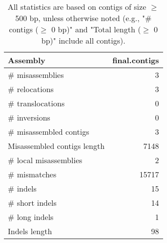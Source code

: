 \documentclass[12pt,a4paper]{article}
\begin{document}
\begin{table}[ht]
\begin{center}
\caption{All statistics are based on contigs of size $\geq$ 500 bp, unless otherwise noted (e.g., "\# contigs ($\geq$ 0 bp)" and "Total length ($\geq$ 0 bp)" include all contigs).}
\begin{tabular}{|l*{1}{|r}|}
\hline
Assembly & final.contigs \\ \hline
\# misassemblies & 3 \\ \hline
\hspace{5mm}\# relocations & 3 \\ \hline
\hspace{5mm}\# translocations & 0 \\ \hline
\hspace{5mm}\# inversions & 0 \\ \hline
\# misassembled contigs & 3 \\ \hline
Misassembled contigs length & 7148 \\ \hline
\# local misassemblies & 2 \\ \hline
\# mismatches & 15717 \\ \hline
\# indels & 15 \\ \hline
\hspace{5mm}\# short indels & 14 \\ \hline
\hspace{5mm}\# long indels & 1 \\ \hline
Indels length & 98 \\ \hline
\end{tabular}
\end{center}
\end{table}
\end{document}
